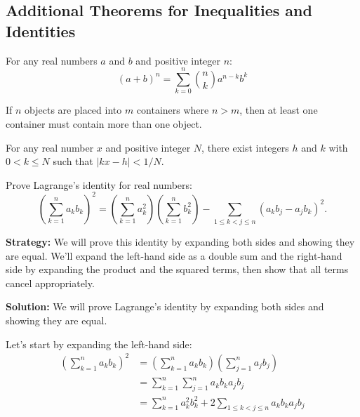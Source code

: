 \subsection*{Additional Theorems for Inequalities and Identities}

\begin{theorem}
For any real numbers $a$ and $b$ and positive integer $n$:
\[
(a + b)^n = \sum_{k=0}^n \binom{n}{k} a^{n-k} b^k
\]
\end{theorem}

\begin{theorem}
If $n$ objects are placed into $m$ containers where $n > m$, then at least one container must contain more than one object.
\end{theorem}

\begin{theorem}
For any real number $x$ and positive integer $N$, there exist integers $h$ and $k$ with $0 < k \leq N$ such that $|kx - h| < 1/N$.
\end{theorem}



\begin{problembox}
\begin{problemstatement}
Prove Lagrange's identity for real numbers:
\[
\left( \sum_{k=1}^n a_k b_k \right)^2 = \left( \sum_{k=1}^n a_k^2 \right)\left( \sum_{k=1}^n b_k^2 \right) - \sum_{1 \leq k < j \leq n} (a_k b_j - a_j b_k)^2.
\]
\end{problemstatement}
\end{problembox}

\noindent\textbf{Strategy:} We will prove this identity by expanding both sides and showing they are equal. We'll expand the left-hand side as a double sum and the right-hand side by expanding the product and the squared terms, then show that all terms cancel appropriately.

\bigskip\noindent\textbf{Solution:}
We will prove Lagrange's identity by expanding both sides and showing they are equal.

Let's start by expanding the left-hand side:
\begin{align*}
\left( \sum_{k=1}^n a_k b_k \right)^2 &= \left( \sum_{k=1}^n a_k b_k \right) \left( \sum_{j=1}^n a_j b_j \right) \\
&= \sum_{k=1}^n \sum_{j=1}^n a_k b_k a_j b_j \\
&= \sum_{k=1}^n a_k^2 b_k^2 + 2 \sum_{1 \leq k < j \leq n} a_k b_k a_j b_j
\end{align*}

